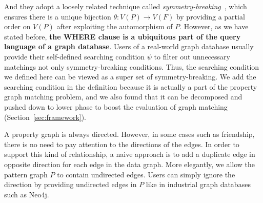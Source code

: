 And they adopt a loosely related technique called \emph{symmetry-breaking}~\cite{DBLP:conf/recomb/GrochowK07},
which ensures there is a unique bijection $\theta: V(P) \rightarrow V(F)$ by providing a partial order on $V(P)$ after exploiting the automorphism of $P$.
However, as we have stated before, \textbf{the WHERE clause is a ubiquitous part of the query language of a graph database}.
Users of a real-world graph database usually provide their self-defined searching condition $\psi$ to filter out unnecessary matchings not only symmetry-breaking conditions.
Thus, the searching condition we defined here can be viewed as a super set of symmetry-breaking.
We add the searching condition in the definition because it is actually a part of the property graph matching problem,
and we also found that it can be decomposed and pushed down to lower phase to boost the evaluation of graph matching (Section~\ref{sec:framework}).

A property graph is always directed.
However, in some cases such as friendship, there is no need to pay attention to the directions of the edges.
In order to support this kind of relationship, a naive approach is to add a duplicate edge in opposite direction for each edge in the data graph.
More elegantly, we allow the pattern graph $P$ to contain undirected edges.
Users can simply ignore the direction by providing undirected edges in $P$ like in industrial graph databases such as Neo4j.
